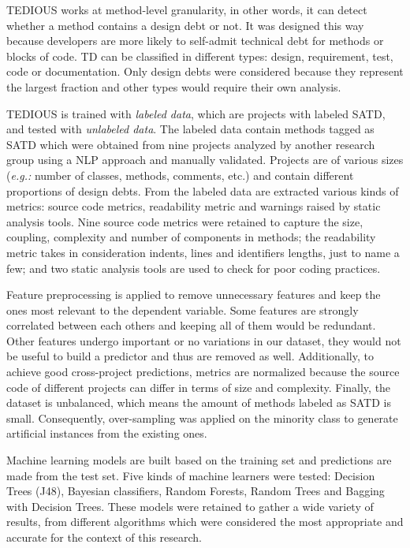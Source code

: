 \ac{TEDIOUS} works at method-level granularity, in other words, it can detect whether a method contains a design debt or not. It was designed this way because developers are more likely to self-admit technical debt for methods or blocks of code. \ac{TD} can be classified in different types: design, requirement, test, code or documentation. Only design debts were considered because they represent the largest fraction and other types would require their own analysis.  \par

\ac{TEDIOUS} is trained with \emph{labeled data}, which are projects with labeled \ac{SATD}, and tested with \emph{unlabeled data}. The labeled data contain methods tagged as \ac{SATD} which were obtained from nine projects analyzed by another research group using a \ac{NLP} approach and manually validated. Projects are of various sizes (\emph{e.g.:} number of classes, methods, comments, etc.) and contain different proportions of design debts. From the labeled data are extracted various kinds of metrics: source code metrics, readability metric and warnings raised by static analysis tools. Nine source code metrics were retained to capture the size, coupling, complexity and number of components in methods; the readability metric takes in consideration indents, lines and identifiers lengths, just to name a few; and two static analysis tools are used to check for poor coding practices. \par

Feature preprocessing is applied to remove unnecessary features and keep the ones most relevant to the dependent variable. Some features are strongly correlated between each others and keeping all of them would be redundant. Other features undergo important or no variations in our dataset, they would not be useful to build a predictor and thus are removed as well. Additionally, to achieve good cross-project predictions, metrics are normalized because the source code of different projects can differ in terms of size and complexity. Finally, the dataset is unbalanced, which means the amount of methods labeled as \ac{SATD} is small. Consequently, over-sampling was applied on the minority class to generate artificial instances from the existing ones. \par

Machine learning models are built based on the training set and predictions are made from the test set. Five kinds of machine learners were tested: Decision Trees (J48), Bayesian classifiers, Random Forests, Random Trees and Bagging with Decision Trees. These models were retained to gather a wide variety of results, from different algorithms which were considered the most appropriate and accurate for the context of this research. \par

